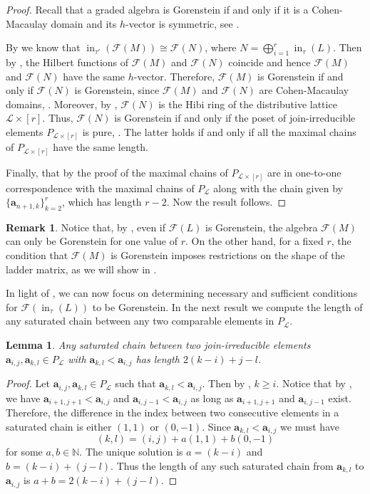 \documentclass[11pt,a4paper,reqno,dvipsnames]{amsart}
\theoremstyle{plain}
\newtheorem{Lemma}[Theorem]{Lemma}
\theoremstyle{definition}
\newtheorem{Assumptions and Discussion}[Theorem]{Assumptions and Discussion}
\newtheorem{Remark}[Theorem]{Remark}
\theoremstyle{remark}
\def\ini{\operatorname{in}}
\newcommand\bda{{\bm a}}
\newcommand\calF{\mathcal{F}}
\newcommand\calL{\mathcal{L}}
\newcommand{\Lr}{\ensuremath{\calL\times[r]}}
\begin{document}
\begin{proof}
Recall that a graded algebra is Gorenstein if and only if it is a Cohen-Macaulay domain and its $h$-vector is symmetric, see \cite[Corollary~4.4.6]{BHCMbook}. 

    By  we know that $\ini_{\tau'}(\calF(M))\cong \calF(N)$, where $N=\bigoplus_{i=1}^{r}\ini_{\tau}(L)$.
    Then by \cite[Proposition 2.4]{CHV96}, the Hilbert functions of $\calF(M)$ and $\calF(N)$ coincide and hence  $\calF(M)$ and $\calF(N)$ have the same $h$-vector.   Therefore, $\calF(M)$ is Gorenstein if and only if $\calF(N)$ is Gorenstein, since $\calF(M)$ and $\calF(N)$ are Cohen-Macaulay domains, . 
    Moreover, by , $\calF(N)$ is the Hibi ring of the distributive lattice $\Lr$. Thus,  $\calF(N)$ is Gorenstein if and only if the poset of join-irreducible elements 
    $P_{\calL\times[r]}$ is pure, \cite{HibiDistLatt}. The latter holds if and only if all the maximal chains of $P_{\calL\times[r]}$ have the same length.
    
    Finally, that by the proof of   the maximal chains of $P_{\calL\times[r]}$ are in one-to-one correspondence with the maximal chains of $P_{\calL}$ along with the chain given by $\{\bda_{n+1, k}\}_{k=2}^{r}$, which has length $r-2$. Now the result follows. 
 \end{proof}   


\begin{Remark}
 Notice that, by , even if $\calF(L)$ is Gorenstein, the algebra $\calF(M)$ can only be Gorenstein for one value of $r$. On the other hand, for a fixed $r$, the condition that $\calF(M)$ is Gorenstein imposes restrictions on the shape of the ladder matrix, as we will show in .
\end{Remark}

  In light of , we can now focus on determining necessary and sufficient conditions for $ \calF(\ini_{\tau}(L))$ to be Gorenstein. In the next result we compute the length of any saturated chain between any two comparable elements in $P_{\calL}$. 


  \begin{Lemma} \label{lem: chain length}
    Any saturated chain between two join-irreducible elements $\bda_{i,j}, \bda_{k,l}\in P_{\calL}$  with $\bda_{k,l}< \bda_{i,j}$ has length $2(k-i)+j-l$.
\end{Lemma}

\begin{proof} Let $\bda_{i,j}, \bda_{k,l}\in P_{\calL}$ such that $\bda_{k,l}< \bda_{i,j}$.
Then  by , $k\ge i$. Notice that by , we have $\bda_{i+1, j+1}<\bda_{i,j}$ and $\bda_{i,j-1}<\bda_{i,j}$ as long as $\bda_{i+1, j+1}$ and $\bda_{i,j-1}$ exist. Therefore, the difference in the index between two consecutive elements in a saturated chain is either $(1,1)$ or $(0,-1)$.
Since $\bda_{k,l}<\bda_{i,j}$ we must have \[(k,l) = (i,j)+a(1,1) + b(0,-1) \]  for some $a,b \in \mathbb{N}$.
The unique solution is $a = (k-i)$ and $b= (k-i) + (j-l)$. Thus the length of any such saturated chain from $\bda_{k,l}$ to $\bda_{i,j}$ is $a+b = 2(k-i)+ (j-l).$  \end{proof}
\end{document}
